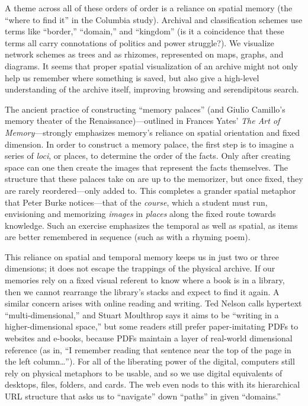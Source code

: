 A theme across all of these orders of order is a reliance on spatial memory (the ``where to find it'' in the Columbia study). Archival and classification schemes use terms like ``border,'' ``domain,'' and ``kingdom'' (is it a coincidence that these terms all carry connotations of politics and power struggle?). We visualize network schemes as trees and as rhizomes, represented on maps, graphs, and diagrams. It seems that proper spatial visualization of an archive might not only help us remember where something is saved, but also give a high-level understanding of the archive itself, improving browsing and serendipitous search.

The ancient practice of constructing ``memory palaces'' (and Giulio Camillo's memory theater of the Renaissance)---outlined in Frances Yates' \emph{The Art of Memory}---strongly emphasizes memory's reliance on spatial orientation and fixed dimension.\autocite{yates_art_1966} In order to construct a memory palace, the first step is to imagine a series of \emph{loci}, or places, to determine the order of the facts. Only after creating space can one then create the images that represent the facts themselves. The structure that these palaces take on are up to the memorizer, but once fixed, they are rarely reordered---only added to. This completes a grander spatial metaphor that Peter Burke notices---that of the \emph{course}, which a student must run, envisioning and memorizing \emph{images} in \emph{places} along the fixed route towards knowledge.\autocite[90]{burke_social_2000} Such an exercise emphasizes the temporal as well as spatial, as items are better remembered in sequence (such as with a rhyming poem).

This reliance on spatial and temporal memory keeps us in just two or three dimensions; it does not escape the trappings of the physical archive. If our memories rely on a fixed visual referent to know where a book is in a library, then we cannot rearrange the library's stacks and expect to find it again. A similar concern arises with online reading and writing. Ted Nelson calls hypertext ``multi-dimensional,'' and Stuart Moulthrop says it aims to be ``writing in a higher-dimensional space,''\autocite{barnet_mandelbrot_2013} but some readers still prefer paper-imitating PDFs to websites and e-books, because PDFs maintain a layer of real-world dimensional reference (as in, ``I remember reading that sentence near the top of the page in the left column\ldots''). For all of the liberating power of the digital, computers still rely on physical metaphors to be usable, and so we use digital equivalents of desktops, files, folders, and cards. The web even nods to this with its hierarchical URL structure that asks us to ``navigate'' down ``paths'' in given ``domains.''

